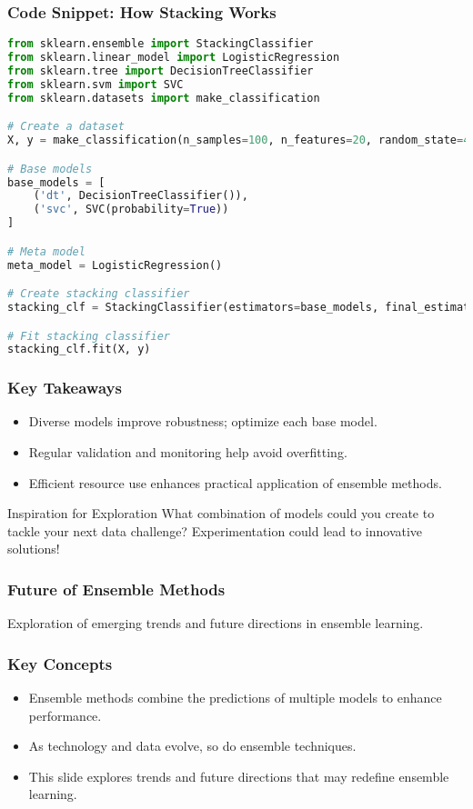 \documentclass[aspectratio=169]{beamer}
\begin{document}
\begin{frame}[fragile]
    \frametitle{Code Snippet: How Stacking Works}
    \begin{lstlisting}[language=Python]
from sklearn.ensemble import StackingClassifier
from sklearn.linear_model import LogisticRegression
from sklearn.tree import DecisionTreeClassifier
from sklearn.svm import SVC
from sklearn.datasets import make_classification

# Create a dataset
X, y = make_classification(n_samples=100, n_features=20, random_state=42)

# Base models
base_models = [
    ('dt', DecisionTreeClassifier()),
    ('svc', SVC(probability=True))
]

# Meta model
meta_model = LogisticRegression()

# Create stacking classifier
stacking_clf = StackingClassifier(estimators=base_models, final_estimator=meta_model)

# Fit stacking classifier
stacking_clf.fit(X, y)
    \end{lstlisting}
\end{frame}

\begin{frame}
    \frametitle{Key Takeaways}
    \begin{itemize}
        \item Diverse models improve robustness; optimize each base model.
        \item Regular validation and monitoring help avoid overfitting.
        \item Efficient resource use enhances practical application of ensemble methods.
    \end{itemize}
    \begin{block}{Inspiration for Exploration}
        What combination of models could you create to tackle your next data challenge? Experimentation could lead to innovative solutions!
    \end{block}
\end{frame}

\begin{frame}[fragile]
    \frametitle{Future of Ensemble Methods}
    Exploration of emerging trends and future directions in ensemble learning.
\end{frame}

\begin{frame}[fragile]
    \frametitle{Key Concepts}
    \begin{itemize}
        \item Ensemble methods combine the predictions of multiple models to enhance performance.
        \item As technology and data evolve, so do ensemble techniques.
        \item This slide explores trends and future directions that may redefine ensemble learning.
    \end{itemize}
\end{frame}
\end{document}
